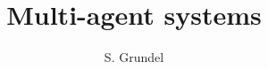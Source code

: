 \documentclass[colorlinks]{article}
\begin{document}
%
\title{Multi-agent systems}
\author{S. Grundel}
\maketitle

%
\end{document}
